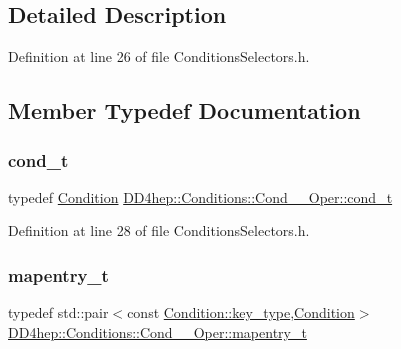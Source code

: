 \subsection{Detailed Description}


Definition at line 26 of file Conditions\+Selectors.\+h.



\subsection{Member Typedef Documentation}
\hypertarget{class_d_d4hep_1_1_conditions_1_1_cond_____oper_aceca9f6a0e8c84364946eace47275d09}{}\label{class_d_d4hep_1_1_conditions_1_1_cond_____oper_aceca9f6a0e8c84364946eace47275d09} 
\subsubsection{\texorpdfstring{cond\+\_\+t}{cond\_t}}
{\footnotesize\ttfamily typedef \hyperlink{class_d_d4hep_1_1_conditions_1_1_condition}{Condition} \hyperlink{class_d_d4hep_1_1_conditions_1_1_cond_____oper_aceca9f6a0e8c84364946eace47275d09}{D\+D4hep\+::\+Conditions\+::\+Cond\+\_\+\+\_\+\+Oper\+::cond\+\_\+t}}



Definition at line 28 of file Conditions\+Selectors.\+h.

\hypertarget{class_d_d4hep_1_1_conditions_1_1_cond_____oper_a877dac3da66795207aed15be219acbdc}{}\label{class_d_d4hep_1_1_conditions_1_1_cond_____oper_a877dac3da66795207aed15be219acbdc} 
\subsubsection{\texorpdfstring{mapentry\+\_\+t}{mapentry\_t}}
{\footnotesize\ttfamily typedef std\+::pair$<$const \hyperlink{class_d_d4hep_1_1_conditions_1_1_condition_a7528efa762e8cc072ef80ea67c3531f9}{Condition\+::key\+\_\+type},\hyperlink{class_d_d4hep_1_1_conditions_1_1_condition}{Condition}$>$ \hyperlink{class_d_d4hep_1_1_conditions_1_1_cond_____oper_a877dac3da66795207aed15be219acbdc}{D\+D4hep\+::\+Conditions\+::\+Cond\+\_\+\+\_\+\+Oper\+::mapentry\+\_\+t}}



